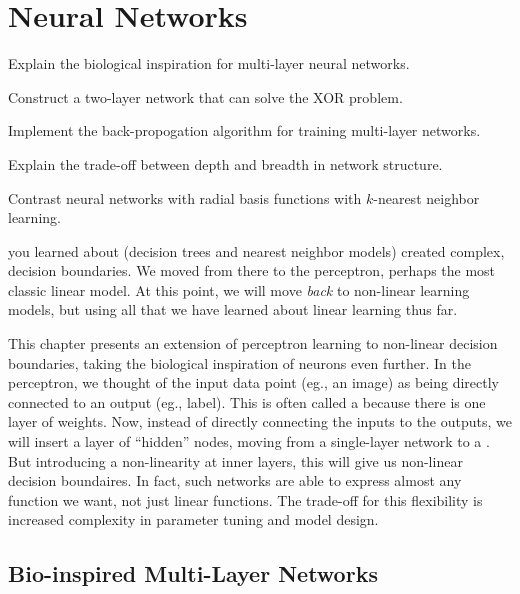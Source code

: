 \chapter{Neural Networks} \label{sec:nnet}

\chapterquote{}{}

\begin{learningobjectives}
\item Explain the biological inspiration for multi-layer neural
  networks.
\item Construct a two-layer network that can solve the XOR problem.
\item Implement the back-propogation algorithm for training
  multi-layer networks.
\item Explain the trade-off between depth and breadth in network
  structure.
\item Contrast neural networks with radial basis functions with
  $k$-nearest neighbor learning.
\end{learningobjectives}

\dependencies{}

 you learned about (decision
trees and nearest neighbor models) created complex,
 decision boundaries.  We moved from there to the
perceptron, perhaps the most classic linear model.  At this point, we
will move \emph{back} to non-linear learning models, but using all
that we have learned about linear learning thus far.

This chapter presents an extension of perceptron learning to
non-linear decision boundaries, taking the biological inspiration of
neurons even further.  In the perceptron, we thought of the input data
point (eg., an image) as being directly connected to an output (eg.,
label).  This is often called a  because
there is one layer of weights.  Now, instead of directly connecting
the inputs to the outputs, we will insert a layer of ``hidden'' nodes,
moving from a single-layer network to a .
But introducing a non-linearity at inner layers, this will give us
non-linear decision boundaires.  In fact, such networks are able to
express almost any function we want, not just linear functions.  The
trade-off for this flexibility is increased complexity in parameter
tuning and model design.

\section{Bio-inspired Multi-Layer Networks}

